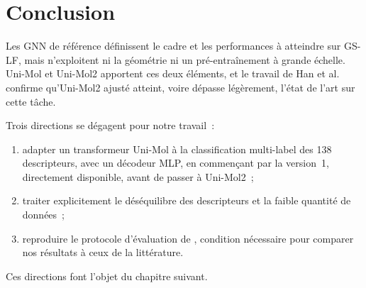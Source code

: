 
\section{Conclusion}
\label{sec:ConclusionEtatArt}

Les GNN de référence définissent le cadre et les performances à atteindre sur GS-LF, mais n'exploitent ni la géométrie ni un pré-entraînement à grande échelle.
Uni-Mol et Uni-Mol2 apportent ces deux éléments, et le travail de Han et al. confirme qu'Uni-Mol2 ajusté atteint, voire dépasse légèrement, l'état de l'art sur cette tâche.

Trois directions se dégagent pour notre travail~:
\begin{enumerate}
   \item adapter un transformeur Uni-Mol à la classification multi-label des 138 descripteurs, avec un décodeur MLP, en commençant par la version~1, directement disponible, avant de passer à Uni-Mol2~;
   \item traiter explicitement le déséquilibre des descripteurs et la faible quantité de données~;
   \item reproduire le protocole d'évaluation de \cite{Han-2026}, condition nécessaire pour comparer nos résultats à ceux de la littérature.
\end{enumerate}
Ces directions font l'objet du chapitre suivant.
